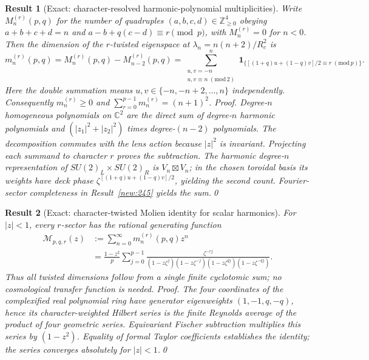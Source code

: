 \documentclass[aps,prd,onecolumn,notitlepage,groupedaddress,11pt]{revtex4-2}
\newtheorem{result}{Result}
\begin{document}
\begin{result}[\textsf{Exact}: character-resolved harmonic-polynomial multiplicities]\label{new:246}
Write $M_n^{(r)}(p,q)$ for the number of quadruples $(a,b,c,d)\in\mathbb Z_{\ge0}^4$ obeying $a+b+c+d=n$ and $a-b+q(c-d)\equiv r\pmod p$, with $M_n^{(r)}=0$ for $n<0$. Then the dimension of the $r$-twisted eigenspace at $\lambda_n=n(n+2)/R_c^2$ is
\begin{equation}\label{eq:twisted246}
 m_n^{(r)}(p,q)=M_n^{(r)}(p,q)-M_{n-2}^{(r)}(p,q)
 =\sum_{\substack{u,v=-n\\u,v\equiv n\;(\mathrm{mod}\,2)}}^n
 \mathbf1_{\{[(1+q)u+(1-q)v]/2\equiv r\;(\mathrm{mod}\,p)\}}.
\end{equation}
Here the double summation means $u,v\in\{-n,-n+2,\dots,n\}$ independently. Consequently $m_n^{(r)}\ge0$ and $\sum_{r=0}^{p-1}m_n^{(r)}=(n+1)^2$.
\textit{Proof.} Degree-$n$ homogeneous polynomials on $\mathbb C^2$ are the direct sum of degree-$n$ harmonic polynomials and $(|z_1|^2+|z_2|^2)$ times degree-$(n-2)$ polynomials. The decomposition commutes with the lens action because $|z|^2$ is invariant. Projecting each summand to character $r$ proves the subtraction. The harmonic degree-$n$ representation of $SU(2)_L\times SU(2)_R$ is $V_n\boxtimes V_n$; in the chosen toroidal basis its weights have deck phase $\zeta^{[(1+q)u+(1-q)v]/2}$, yielding the second count. Fourier-sector completeness in Result~\ref{new:245} yields the sum.\qed
\end{result}

\begin{result}[\textsf{Exact}: character-twisted Molien identity for scalar harmonics]\label{new:247}
For $|z|<1$, every $r$-sector has the rational generating function
\begin{align}\label{eq:twisted247}
 \mathcal M_{p,q,r}(z)&:=\sum_{n=0}^{\infty}m_n^{(r)}(p,q)z^n \\
 &=\frac{1-z^2}{p}\sum_{j=0}^{p-1}
 \frac{\zeta^{-rj}}{(1-z\zeta^j)(1-z\zeta^{-j})(1-z\zeta^{qj})(1-z\zeta^{-qj})}.
\end{align}
Thus all twisted dimensions follow from a single finite cyclotomic sum; no cosmological transfer function is needed.
\textit{Proof.} The four coordinates of the complexified real polynomial ring have generator eigenweights $(1,-1,q,-q)$, hence its character-weighted Hilbert series is the finite Reynolds average of the product of four geometric series. Equivariant Fischer subtraction multiplies this series by $(1-z^2)$. Equality of formal Taylor coefficients establishes the identity; the series converges absolutely for $|z|<1$.\qed
\end{result}
\end{document}
